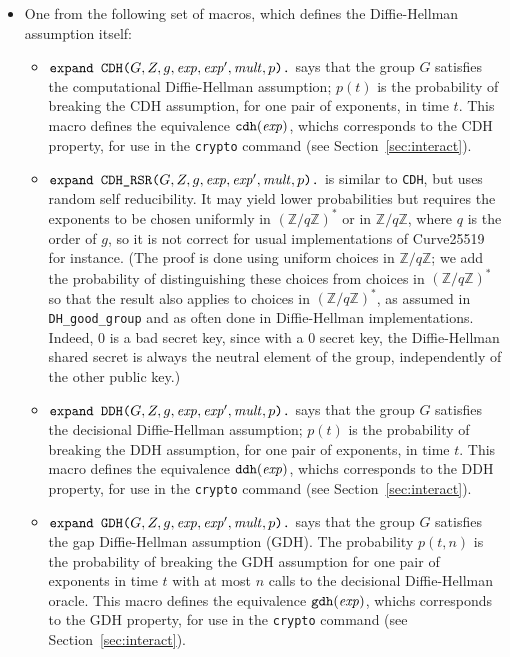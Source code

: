 \documentclass{article}
\begin{document}
\begin{itemize}
\begin{itemize}
   \item One from the following set of macros, which defines the Diffie-Hellman assumption itself:
     \begin{itemize}
     \item $\texttt{expand\ CDH(}G, Z, g, \mathit{exp}, \mathit{exp}', \mathit{mult}, p\texttt{).}$ says that the group $G$ satisfies the computational
  Diffie-Hellman assumption; $p(t)$ is the probability of breaking the CDH assumption, for one pair of exponents, in time $t$.
   This macro defines the equivalence $\texttt{cdh}(\mathit{exp})$, whichs corresponds to the CDH property, for use in the
   \texttt{crypto} command (see Section~\ref{sec:interact}).

     \item $\texttt{expand\ CDH\_RSR(}G, Z, g, \mathit{exp}, \mathit{exp}', \mathit{mult}, p\texttt{).}$ 
       is similar to \texttt{CDH}, but uses random self reducibility. It may yield lower probabilities but requires the exponents 
       to be chosen uniformly in $(\mathbb{Z}/q\mathbb{Z})^*$ or in $\mathbb{Z}/q\mathbb{Z}$, where $q$ is the order of $g$, 
       so it is not correct for usual implementations of Curve25519 for instance. (The proof is done using uniform choices in $\mathbb{Z}/q\mathbb{Z}$; we add the probability of distinguishing these choices from choices in $(\mathbb{Z}/q\mathbb{Z})^*$ so that the result also applies to choices in $(\mathbb{Z}/q\mathbb{Z})^*$, as assumed in \texttt{DH\_good\_group} and as often done in Diffie-Hellman implementations. Indeed, 0 is a bad secret key, since with a 0 secret key, the Diffie-Hellman shared secret is always the neutral element of the group, independently of the other public key.)

     \item $\texttt{expand\ DDH(}G, Z, g, \mathit{exp}, \mathit{exp}', \mathit{mult}, p\texttt{).}$
       says that the group $G$ satisfies the decisional Diffie-Hellman
       assumption; $p(t)$ is the probability of breaking the DDH
       assumption, for one pair of exponents, in time $t$.
   This macro defines the equivalence $\texttt{ddh}(\mathit{exp})$, whichs corresponds to the DDH property, for use in the
   \texttt{crypto} command (see Section~\ref{sec:interact}).

     \item $\texttt{expand\ GDH(}G, Z, g, \mathit{exp}, \mathit{exp}', \mathit{mult}, p\texttt{).}$
       says that the group $G$ satisfies the gap Diffie-Hellman
       assumption (GDH). The probability $p(t,n)$ is the probability of breaking
       the GDH assumption for one pair of exponents in time $t$ with at most $n$ 
       calls to the decisional Diffie-Hellman oracle. This macro defines
       the equivalence $\texttt{gdh}(\mathit{exp})$, whichs corresponds to the GDH property, for use in the
       \texttt{crypto} command (see Section~\ref{sec:interact}).


\end{itemize}
\end{itemize}
\end{itemize}
\end{document}
